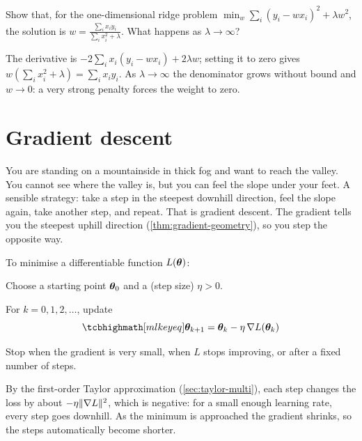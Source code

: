 \begin{exercise}
Show that, for the one-dimensional ridge problem
$\min_w \sum_i(y_i - wx_i)^2 + \lambda w^2$, the solution is
$w = \frac{\sum_ix_iy_i}{\sum_ix_i^2 + \lambda}$. What happens as
$\lambda\to\infty$?
\end{exercise}
\begin{solution}
The derivative is $-2\sum_ix_i(y_i - wx_i) + 2\lambda w$; setting it to zero
gives $w\left(\sum_ix_i^2 + \lambda\right) = \sum_ix_iy_i$. As
$\lambda\to\infty$ the denominator grows without bound and $w \to 0$: a very
strong penalty forces the weight to zero.
\end{solution}

\section{Gradient descent}\label{sec:gradient-descent}

\begin{picturethis}
You are standing on a mountainside in thick fog and want to reach the valley.
You cannot see where the valley is, but you can feel the slope under your feet.
A sensible strategy: take a step in the steepest downhill direction, feel the
slope again, take another step, and repeat. That is gradient descent. The
gradient tells you the steepest uphill direction (\cref{thm:gradient-geometry}),
so you step the opposite way.
\end{picturethis}

\begin{algorithm}\label{alg:gradient-descent}
To minimise a differentiable function $L(\bm{\theta})$:
\begin{steps}
  \item Choose a starting point $\bm{\theta}_0$ and a  (step size)
    $\eta > 0$.
  \item For $k = 0, 1, 2, \dots$, update
    \[
      \keyeq{\vtheta_{k+1} = \vtheta_k - \eta\,\nabla L(\vtheta_k)}
    \]
  \item Stop when the gradient is very small, when $L$ stops improving, or after
    a fixed number of steps.
\end{steps}
\end{algorithm}

By the first-order Taylor approximation (\cref{sec:taylor-multi}), each step
changes the loss by about $-\eta\lVert\nabla L\rVert^2$, which is negative: for a small
enough learning rate, every step goes downhill. As the minimum is approached the
gradient shrinks, so the steps automatically become shorter.

